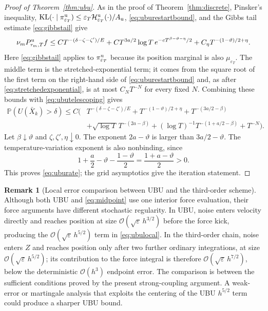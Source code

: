 \documentclass[11pt]{article}
\theoremstyle{definition}
\newtheorem{remark}[theorem]{Remark}
\newcommand{\KL}{\operatorname{KL}}
\newcommand{\cH}{\mathcal H}
\newcommand{\eps}{\varepsilon}
\begin{document}
\begin{proof}[Proof of Theorem~\ref{thm:ubu}]
As in the proof of Theorem~\ref{thm:discrete}, Pinsker's inequality,
$\KL(\cdot\mid\pi^{\rm u}_{\eps_T})\leq\eps_T\cH^{\rm u}_{\eps_T}(\cdot)/A_{\rm u}$,
\eqref{eq:uburestartbound}, and the Gibbs tail estimate \eqref{eq:gibbstail}
give
\[
 \nu_mP^{\rm u}_{\tau_m,T}f
 \leq CT^{-(\delta-\zeta-\zeta')/E}
 +CT^{3a/2}\log T\,e^{-cT^{\beta-\vartheta-\eta}/2}
 +C_\eta T^{-(1-\vartheta)/2+\eta}.
\]
Here \eqref{eq:gibbstail} applies to $\pi^{\rm u}_{\eps_T}$ because its
position marginal is also $\mu_{\eps_T}$. The middle term is the
stretched-exponential term; it comes from the square root of the first term
on the right-hand side of \eqref{eq:uburestartbound} and, as after
\eqref{eq:stretchedexponential}, is at most $C_NT^{-N}$ for every fixed $N$. Combining these bounds with
\eqref{eq:ubutelescoping} gives
\begin{align*}
 \mathbb P\left(U(\bar X_k)>\delta\right)\leq C\bigg(&
 T^{-(\delta-\zeta-\zeta')/E}
 +T^{-(1-\vartheta)/2+\eta}
 +T^{-(3a/2-\beta)}\\
 &+\sqrt{\log T}\,T^{-(2a-\beta)}
 +(\log T)^{-1}T^{-(1+a/2-\beta)}+T^{-N}\bigg).
\end{align*}
Let $\beta\downarrow\vartheta$ and
$\zeta,\zeta',\eta\downarrow0$. The exponent $2a-\vartheta$ is larger than
$3a/2-\vartheta$. The temperature-variation exponent is also nonbinding,
since
\[
 1+\frac a2-\vartheta-\frac{1-\vartheta}{2}
 =\frac{1+a-\vartheta}{2}>0.
\]
This proves \eqref{eq:uburate}; the grid
asymptotics give the iteration statement.
\end{proof}

\begin{remark}[Local error comparison between UBU and the third-order scheme]
\label{rem:ubunoisetiming}
Although both UBU and \eqref{eq:midpoint} use one interior force evaluation,
their force arguments have different stochastic regularity. In UBU, noise
enters velocity directly and reaches position at size
$\mathcal{O}(\sqrt\eps\,h^{3/2})$ before the force kick, producing the
$\mathcal{O}(\sqrt\eps\,h^{5/2})$ term in \eqref{eq:ubulocal}. In the third-order
chain, noise enters $Z$ and reaches position only after two further ordinary
integrations, at size $\mathcal{O}(\sqrt\eps\,h^{5/2})$; its contribution to the force
integral is therefore $\mathcal{O}(\sqrt\eps\,h^{7/2})$, below the deterministic
$\mathcal{O}(h^3)$ endpoint error. The comparison is between the sufficient conditions
proved by the present strong-coupling argument. A weak-error or martingale
analysis that exploits the centering of the UBU $h^{5/2}$ term could produce
a sharper UBU bound.
\end{remark}
\end{document}
